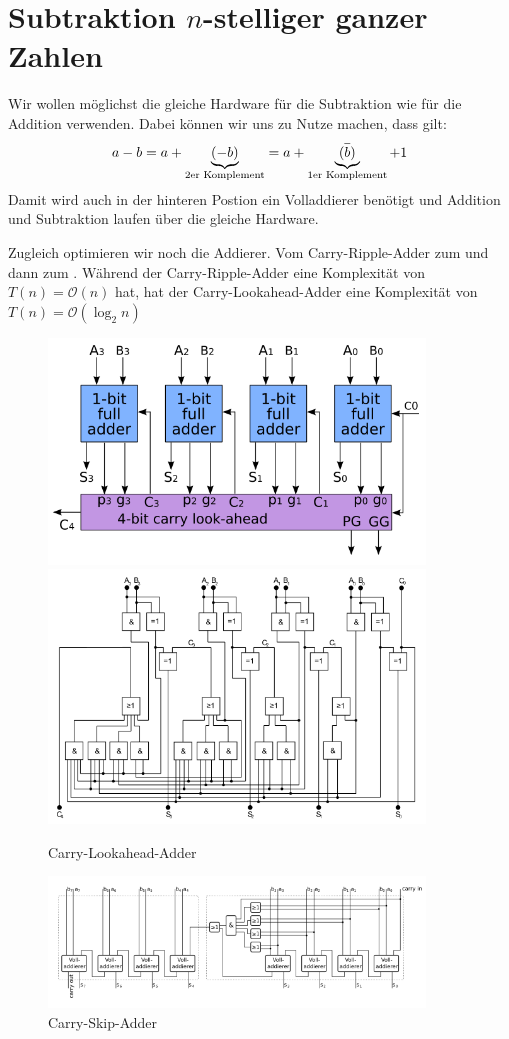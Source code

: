 \section{Subtraktion $n$-stelliger ganzer Zahlen}

Wir wollen möglichst die gleiche Hardware für die Subtraktion wie für die Addition verwenden. Dabei können wir uns zu Nutze machen, dass gilt:
\begin{align}
	a-b=a+\underbrace{(-b)}_{\text{2er Komplement}}=a+\underbrace{(\overline{b})}_{\text{1er Komplement}}+1\notag
\end{align}
Damit wird auch in der hinteren Postion ein Volladdierer benötigt und Addition und Subtraktion laufen über die gleiche Hardware.

Zugleich optimieren wir noch die Addierer. Vom Carry-Ripple-Adder zum  und dann zum . Während der Carry-Ripple-Adder eine Komplexität von $T(n)=\mathcal{O}(n)$ hat, hat der Carry-Lookahead-Adder eine Komplexität von $T(n)=\mathcal{O}(\log_2 n)$

\begin{figure}[ht]
	\centering
	\includegraphics[width=10cm]{images/Carry-Lookahead-Adder_2.png}
	\includegraphics[width=10cm]{images/Carry-Lookahead-Adder.png}
	\caption{Carry-Lookahead-Adder}
\end{figure}

\begin{figure}[ht]
	\centering
	\includegraphics[width=10cm]{images/Carry-Skip-Adder.png}
	\caption{Carry-Skip-Adder}
\end{figure}